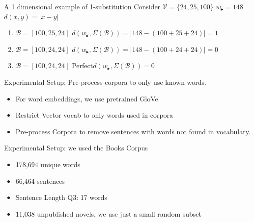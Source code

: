 \documentclass[]{beamer}
\newcommand{\s}{\tilde{s}}
\newcommand{\V}{\mathcal{V}}
\newcommand{\B}{\mathcal{B}}
\renewcommand{\s}{w_{\blacktriangleright}}
\begin{document}
\begin{frame}{A 1 dimensional example of 1-substitution}
	\vectorselectionproblemdefnalt
	\vfill
	Consider $\V=\{24,25,100\}$ \hfill $\s=148$ \hfill $d(x,y)=|x-y|$
	\begin{enumerate}
		\item<1-> $\B=[100,25,24]$ \hfill $d(\s,\Sigma(\B))=|148-(100+25+24)|=1$ 
		\item<2-> $\B=[100,24,24]$ \hfill $d(\s,\Sigma(\B))=|148-(100+24+24)|=0$ 
		\item<3-> $\B=[100,24,24]$ \hfill Perfect\hfill $d(\s,\Sigma(\B))=0$ 
	\end{enumerate}
	\vfill
	\vfill
\end{frame}


\begin{frame}{Experimental Setup: Pre-process corpora to only use known words.}
	\begin{itemize}
		\item<1-> For word embeddings, we use pretrained GloVe 
		\item<2-> Restrict Vector vocab to only words used in corpora
		\item<2-> Pre-process Corpora to remove sentences with words not found in vocabulary.
	\end{itemize}
\end{frame}

\begin{frame}{Experimental Setup: we used the Books Corpus}

	\begin{itemize}
		\item 178,694 unique words
		\item 66,464 sentences 
		\item Sentence Length Q3: 17 words
		\item 11,038 unpublished novels, we use just a small random subset
	\end{itemize}

\end{frame}
\end{document}
